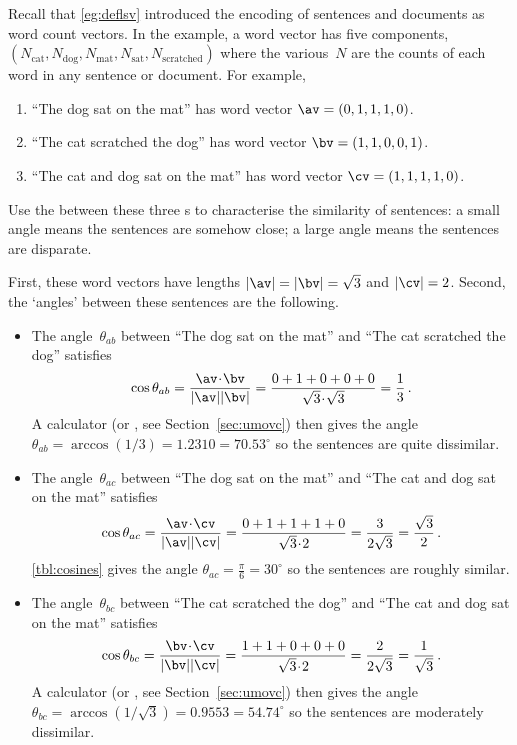 \begin{example} \label{eg:lsidot}
Recall that \autoref{eg:deflsv} introduced the encoding of sentences and documents as word count vectors.
In the example, a word vector has five components, \((N_{\text{cat}},N_{\text{dog}},N_{\text{mat}},N_{\text{sat}},N_{\text{scratched}})\) where the various~\(N\) are the counts of each word in any sentence or document. For example,
\begin{enumerate}
\item ``The dog sat on the mat'' has word vector \(\av=(0,1,1,1,0)\).
\item ``The cat scratched the dog'' has word vector \(\bv=(1,1,0,0,1)\).
\item ``The cat and dog sat on the mat'' has word vector \(\cv=(1,1,1,1,0)\).
\end{enumerate}
Use the  between these three s to characterise the similarity of sentences: a small angle means the sentences are somehow close; a large angle means the sentences are disparate.
\begin{solution} 
First, these word vectors have lengths \(|\av|=|\bv|=\sqrt3\) and \(|\cv|=2\).
Second, the `angles' between these sentences are the following.
\begin{itemize}
\item The angle~\(\theta_{ab}\) between ``The dog sat on the mat'' and ``The cat scratched the dog'' satisfies
\begin{equation*}
\cos\theta_{ab}=\frac{\av\cdot\bv}{|\av||\bv|}
=\frac{0+1+0+0+0}{\sqrt3\cdot\sqrt3}=\frac13\,.
\end{equation*}
A calculator  (or \script, see Section~\ref{sec:umovc}) then gives the angle \(\theta_{ab} =\arccos(1/3) =1.2310=70.53^\circ\) so the sentences are quite dissimilar.

\item The angle~\(\theta_{ac}\) between ``The dog sat on the mat'' and ``The cat and dog sat on the mat'' satisfies
\begin{equation*}
\cos\theta_{ac}=\frac{\av\cdot\cv}{|\av||\cv|}
=\frac{0+1+1+1+0}{\sqrt3\cdot2}=\frac3{2\sqrt3}=\frac{\sqrt3}2\,.
\end{equation*}
\autoref{tbl:cosines} gives the angle \(\theta_{ac}=\tfrac\pi6=30^\circ\) so the sentences are roughly similar.

\item The angle~\(\theta_{bc}\) between ``The cat scratched the dog'' and ``The cat and dog sat on the mat'' satisfies
\begin{equation*}
\cos\theta_{bc}=\frac{\bv\cdot\cv}{|\bv||\cv|}
=\frac{1+1+0+0+0}{\sqrt3\cdot2}=\frac2{2\sqrt3}=\frac1{\sqrt3}\,.
\end{equation*}
A calculator  (or \script, see Section~\ref{sec:umovc}) then gives the angle \(\theta_{bc} =\arccos(1/\sqrt3) =0.9553 =54.74^\circ\) so the sentences are moderately dissimilar.


\end{itemize}
\end{solution}
\end{example}
